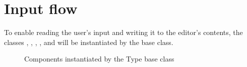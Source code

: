 


\section{Input flow}
\label{sec:module_architecture}



To enable reading the user's input and writing it to the editor's contents, the classes , , , ,  and  will be instantiated by the  base class.


\begin{figure}[!htb]
\centering
{}
\caption{Components instantiated by the Type base class}
\label{fig:type_base_components}
\end{figure}

